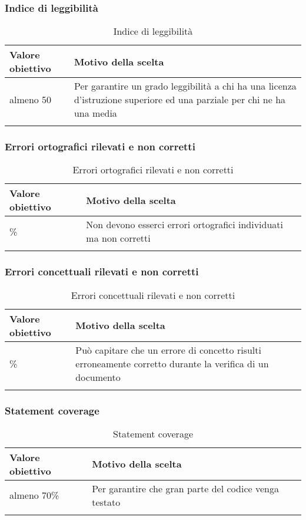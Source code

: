 \documentclass[../PianoDiQualifica_v3.0.0.tex]{subfiles}
\begin{document}
		\subsubsection{Indice di leggibilità}
			\begin{longtable}[c] { >{\centering\arraybackslash}p{4cm} p{7cm} }
				\toprule
				\centerline{\textbf{Valore obiettivo}} & \centerline{\textbf{Motivo della scelta}} \\
				\midrule
					almeno 50 &	Per garantire un grado leggibilità a chi ha una licenza d'istruzione superiore ed una parziale per chi ne ha una media \\
				\bottomrule
				\caption{Indice di leggibilità}
			\end{longtable}

		\subsubsection{Errori ortografici rilevati e non corretti}
			\begin{longtable}[c] { >{\centering\arraybackslash}p{4cm} p{7cm} }
				\toprule
				\centerline{\textbf{Valore obiettivo}} & \centerline{\textbf{Motivo della scelta}} \\
				\midrule
					0\% & Non devono esserci errori ortografici individuati ma non corretti \\
				\bottomrule
				\caption{Errori ortografici rilevati e non corretti}
			\end{longtable}

		\subsubsection{Errori concettuali rilevati e non corretti}
			\begin{longtable}[c] { >{\centering\arraybackslash}p{4cm} p{7cm} }
				\toprule
				\centerline{\textbf{Valore obiettivo}} & \centerline{\textbf{Motivo della scelta}} \\
				\midrule
					5\% & Può capitare che un errore di concetto risulti erroneamente corretto durante la verifica di un documento \\
				\bottomrule
				\caption{Errori concettuali rilevati e non corretti}
			\end{longtable}

		\subsubsection{Statement coverage}
			\begin{longtable}[c] { >{\centering\arraybackslash}p{4cm} p{7cm} }
				\toprule
				\centerline{\textbf{Valore obiettivo}} & \centerline{\textbf{Motivo della scelta}} \\
				\midrule
					almeno 70\% & Per garantire che gran parte del codice venga testato \\
				\bottomrule
				\caption{Statement coverage}
			\end{longtable}
\end{document}
